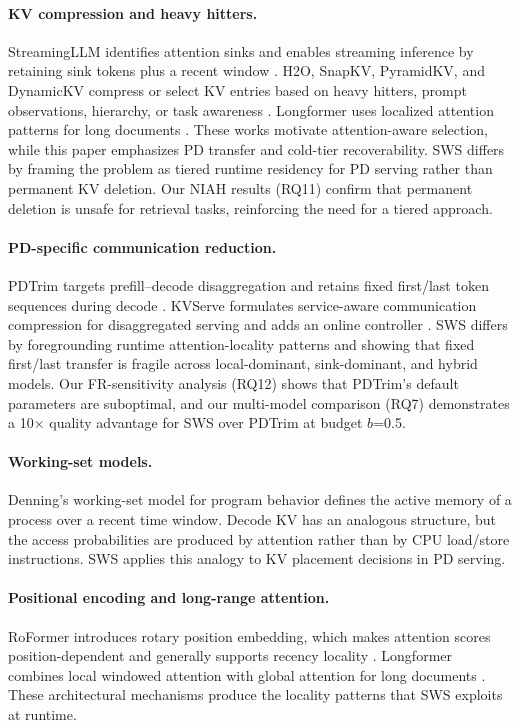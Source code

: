 \documentclass[11pt]{article}
\newcommand{\method}{SWS}
\newcommand{\sws}{SWS}
\theoremstyle{definition}
\theoremstyle{plain}
\begin{document}
\paragraph{KV compression and heavy hitters.}
StreamingLLM identifies attention sinks and enables streaming inference by retaining sink tokens plus a recent window \citep{streamingllm}.  H2O, SnapKV, PyramidKV, and DynamicKV compress or select KV entries based on heavy hitters, prompt observations, hierarchy, or task awareness \citep{h2o,snapkv,pyramidkv,dynamickv}.  Longformer uses localized attention patterns for long documents \citep{longformer}.  These works motivate attention-aware selection, while this paper emphasizes PD transfer and cold-tier recoverability.  \method{} differs by framing the problem as tiered runtime residency for PD serving rather than permanent KV deletion.  Our NIAH results (RQ11) confirm that permanent deletion is unsafe for retrieval tasks, reinforcing the need for a tiered approach.

\paragraph{PD-specific communication reduction.}
PDTrim targets prefill--decode disaggregation and retains fixed first/last token sequences during decode \citep{pdtrim}.  KVServe formulates service-aware communication compression for disaggregated serving and adds an online controller \citep{kvserve}.  \method{} differs by foregrounding runtime attention-locality patterns and showing that fixed first/last transfer is fragile across local-dominant, sink-dominant, and hybrid models.  Our FR-sensitivity analysis (RQ12) shows that PDTrim's default parameters are suboptimal, and our multi-model comparison (RQ7) demonstrates a 10$\times$ quality advantage for \sws{} over PDTrim at budget $b$=0.5.

\paragraph{Working-set models.}
Denning's working-set model for program behavior \citep{denning1968working} defines the active memory of a process over a recent time window.  Decode KV has an analogous structure, but the access probabilities are produced by attention rather than by CPU load/store instructions.  \method{} applies this analogy to KV placement decisions in PD serving.

\paragraph{Positional encoding and long-range attention.}
RoFormer introduces rotary position embedding, which makes attention scores position-dependent and generally supports recency locality \citep{su2021roformer}.  Longformer combines local windowed attention with global attention for long documents \citep{longformer}.  These architectural mechanisms produce the locality patterns that \method{} exploits at runtime.
\end{document}
